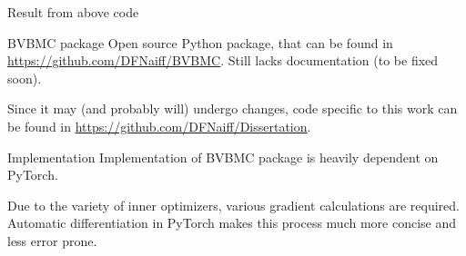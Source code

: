 \documentclass{beamer}
\begin{document}
\begin{frame}
\begin{block}{Result from above code}
\begin{figure}
	\centering
	\captionsetup[subfigure]{labelformat=empty}
\end{figure}
\end{block}
\end{frame}
\begin{frame}
\begin{block}{BVBMC package}
	Open source Python package, that can be found in \url{https://github.com/DFNaiff/BVBMC}. Still lacks documentation (to be fixed soon).
	
	Since it may (and probably will) undergo changes, code specific to this work can be found in \url{https://github.com/DFNaiff/Dissertation}.
\end{block}

\begin{block}{Implementation}
Implementation of BVBMC package is heavily dependent on PyTorch.

Due to the variety of inner optimizers, various gradient calculations are required. Automatic differentiation in PyTorch makes this process much more concise and less error prone.
\end{block}

\end{frame}
\end{document}
